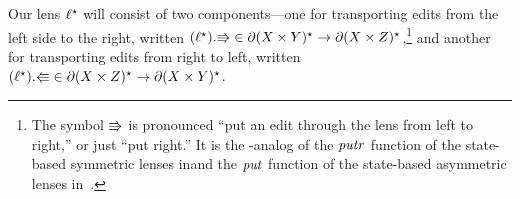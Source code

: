 

Our lens $\ell^\star$ will consist of two components---one for transporting edits
from the left side to the right, written $(\ell^\star).\mathord{\Rrightarrow} \in \partial(X
\times Y)^\star \to \partial(X \times Z)^\star$,\footnote{The symbol $\mathord{\Rrightarrow}$ is
  pronounced ``put an edit through the lens from left to right,'' or just
  ``put right.''  It is the {\edit}-analog of the $\mathit{putr}$ function of the
  state-based symmetric lenses in\symmlenses and the
  $\mathit{put}$ function of the state-based asymmetric lenses
  in~\cite{Focal2005,Boomerang07}.} and another for transporting
edits from right to left, written $(\ell^\star).\mathord{\Lleftarrow} \in \partial(X \times
Z)^\star \to \partial(X \times Y)^\star$.
%

